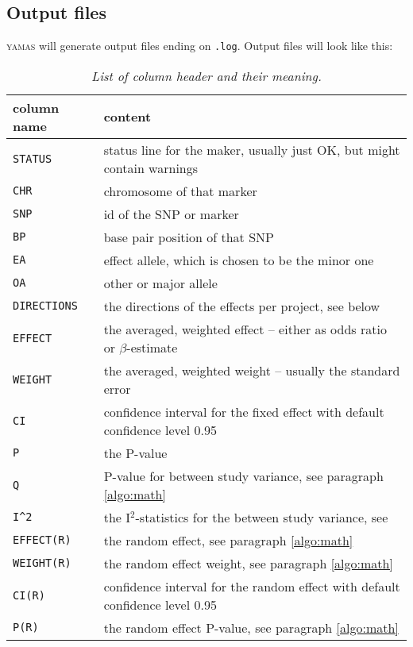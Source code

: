 \subsection{Output files}
\label{usage:output}
\textsc{yamas} will generate output files ending on \verb+.log+. Output files will look like this:

\begin{table}[H]
 \caption{\emph{List of column header and their meaning.}}
 \centering
\begin{tabular}{ll}
\rowcolor{light-gray}column name & content\\\hline
\verb+STATUS+     & status line for the maker, usually just OK, but might contain warnings\\
\verb+CHR+        & chromosome of that marker\\
\verb+SNP+        & id of the SNP or marker\\
\verb+BP+         & base pair position of that SNP\\
\verb+EA+         & effect allele, which is chosen to be the minor one\\
\verb+OA+         & other or major allele\\
\verb+DIRECTIONS+ & the directions of the effects per project, see below\\
\verb+EFFECT+     & the averaged, weighted effect -- either as odds ratio or $\beta$-estimate\\
\verb+WEIGHT+     & the averaged, weighted weight -- usually the standard error\\
\verb+CI+	  & confidence interval for the fixed effect with default confidence level 0.95\\
\verb+P+          & the P-value\\
\verb+Q+          & P-value for between study variance, see paragraph \ref{algo:math}\\
\verb+I^2+        & the I$^2$-statistics for the between study variance, see \citet{Huedo-Medina2006}\\
\verb+EFFECT(R)+  & the random effect, see paragraph \ref{algo:math}\\
\verb+WEIGHT(R)+ & the random effect weight, see paragraph \ref{algo:math}\\
\verb+CI(R)+	  & confidence interval for the random effect with default confidence level 0.95\\
\verb+P(R)+ & the random effect P-value, see paragraph \ref{algo:math}\\
\end{tabular}
\end{table}

